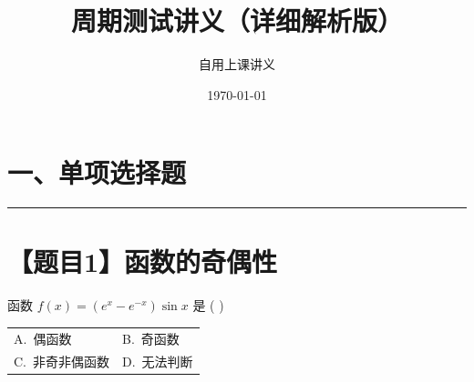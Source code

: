 \documentclass[UTF8,10pt]{ctexart}
\title{\textbf{周期测试讲义（详细解析版）}}
\author{自用上课讲义}
\date{\today}
\makeatletter
\newcommand{\problemrule}{\par\filbreak\noindent\rule{\textwidth}{1.5pt}\vspace{-0.5em}}
\newcommand{\twochoices}[4]{
    \par\noindent
    \begin{tabular*}{\linewidth}{@{\extracolsep{\fill}}ll}
        A.~#1 & B.~#2 \\
        C.~#3 & D.~#4
    \end{tabular*}
}
\makeatother
\begin{document}
\small
\pagestyle{fancy}

\maketitle

\section*{一、单项选择题}

\problemrule
\section*{【题目1】函数的奇偶性}
函数 $f(x) = (e^x - e^{-x})\sin x$ 是 ( \quad )
\twochoices{偶函数}{奇函数}{非奇非偶函数}{无法判断}
\end{document}
